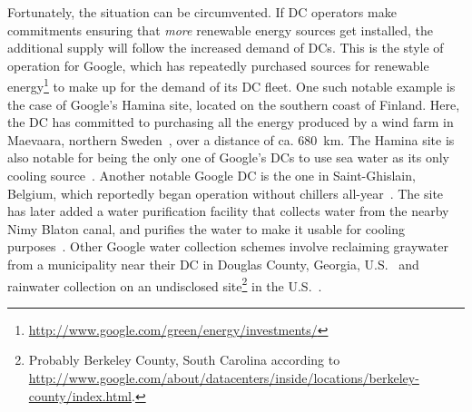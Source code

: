 \documentclass[officiallayout]{tktla}
\begin{document}
Fortunately, the situation can be circumvented. If DC operators make
commitments ensuring that \emph{more} renewable energy sources get installed,
the additional supply will follow the increased demand of DCs. This is the
style of operation for Google, which has repeatedly purchased sources for
renewable
energy\footnote{\url{http://www.google.com/green/energy/investments/}} to make
up for the demand of its DC fleet. One such notable example is the case of
Google's Hamina site, located on the southern coast of Finland. Here, the DC
has committed to purchasing all the energy produced by a wind farm in
Maevaara, northern Sweden~\cite{Sterin2013}, over a distance of ca. 680~km.
The Hamina site is also notable for being the only one of Google's DCs to use
sea water as its only cooling source~\cite{Larsson2010,Metz2010,Metz2012}.
Another notable Google DC is the one in Saint-Ghislain, Belgium, which
reportedly began operation without chillers all-year~\cite{Miller2009}. The
site has later added a water purification facility that collects water from
the nearby Nimy Blaton canal, and purifies the water to make it usable for
cooling purposes~\cite{Miller2010,Metz2012}. Other Google water collection
schemes involve reclaiming graywater from a municipality near their DC in
Douglas County, Georgia, U.S.~\cite{Brown2012} and rainwater collection on an
undisclosed site\footnote{Probably Berkeley County, South Carolina according
to
\url{http://www.google.com/about/datacenters/inside/locations/berkeley-county/index.html}.}
in the U.S.~\cite{Miller2010}.
\end{document}
